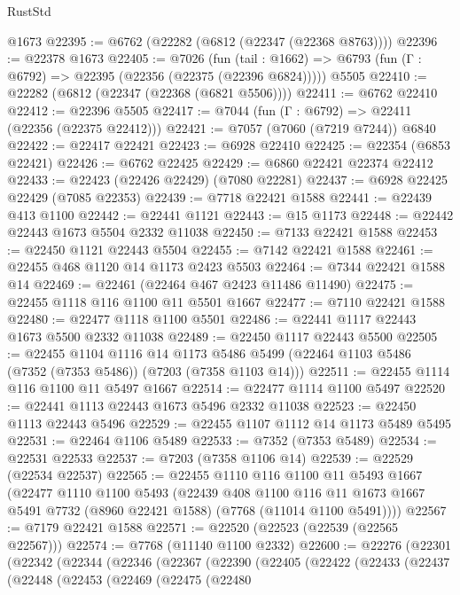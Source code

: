 \begin{lexlean}{RustStd}
\begin{coremodule}
    @1673
@22395 := @6762 (@22282 (@6812 (@22347 (@22368 @8763))))
@22396 := @22378 @1673
@22405 := @7026
    (fun (tail : @1662) => @6793 (fun (Γ : @6792) => @22395 (@22356 (@22375 (@22396 @6824)))))
    @5505
@22410 := @22282 (@6812 (@22347 (@22368 (@6821 @5506))))
@22411 := @6762 @22410
@22412 := @22396 @5505
@22417 := @7044 (fun (Γ : @6792) => @22411 (@22356 (@22375 @22412)))
@22421 := @7057 (@7060 (@7219 @7244)) @6840
@22422 := @22417 @22421
@22423 := @6928 @22410
@22425 := @22354 (@6853 @22421)
@22426 := @6762 @22425
@22429 := @6860 @22421 @22374 @22412
@22433 := @22423 (@22426 @22429) (@7080 @22281)
@22437 := @6928 @22425 @22429 (@7085 @22353)
@22439 := @7718 @22421 @1588
@22441 := @22439 @413 @1100
@22442 := @22441 @1121
@22443 := @15 @1173
@22448 := @22442 @22443 @1673 @5504 @2332 @11038
@22450 := @7133 @22421 @1588
@22453 := @22450 @1121 @22443 @5504
@22455 := @7142 @22421 @1588
@22461 := @22455 @468 @1120 @14 @1173 @2423 @5503
@22464 := @7344 @22421 @1588 @14
@22469 := @22461 (@22464 @467 @2423 @11486 @11490)
@22475 := @22455 @1118 @116 @1100 @11 @5501 @1667
@22477 := @7110 @22421 @1588
@22480 := @22477 @1118 @1100 @5501
@22486 := @22441 @1117 @22443 @1673 @5500 @2332 @11038
@22489 := @22450 @1117 @22443 @5500
@22505 := @22455
    @1104
    @1116
    @14
    @1173
    @5486
    @5499
    (@22464 @1103 @5486 (@7352 (@7353 @5486)) (@7203 (@7358 @1103 @14)))
@22511 := @22455 @1114 @116 @1100 @11 @5497 @1667
@22514 := @22477 @1114 @1100 @5497
@22520 := @22441 @1113 @22443 @1673 @5496 @2332 @11038
@22523 := @22450 @1113 @22443 @5496
@22529 := @22455 @1107 @1112 @14 @1173 @5489 @5495
@22531 := @22464 @1106 @5489
@22533 := @7352 (@7353 @5489)
@22534 := @22531 @22533
@22537 := @7203 (@7358 @1106 @14)
@22539 := @22529 (@22534 @22537)
@22565 := @22455
    @1110
    @116
    @1100
    @11
    @5493
    @1667
    (@22477
      @1110
      @1100
      @5493
      (@22439
        @408
        @1100
        @116
        @11
        @1673
        @1667
        @5491
        @7732
        (@8960 @22421 @1588)
        (@7768 (@11014 @1100 @5491))))
@22567 := @7179 @22421 @1588
@22571 := @22520 (@22523 (@22539 (@22565 @22567)))
@22574 := @7768 (@11140 @1100 @2332)
@22600 := @22276
    (@22301
      (@22342
        (@22344
          (@22346
            (@22367
              (@22390
                (@22405
                  (@22422
                    (@22433
                      (@22437
                        (@22448
                          (@22453
                            (@22469
                              (@22475
                                (@22480

\end{coremodule}
\end{lexlean}
